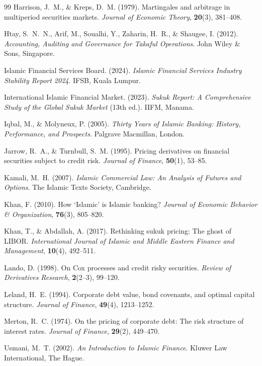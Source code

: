 \documentclass[10pt,twocolumn]{article}
\theoremstyle{plain}
\theoremstyle{definition}
\begin{document}
\begin{thebibliography}{99}
Harrison, J.~M., \& Kreps, D.~M. (1979).
Martingales and arbitrage in multiperiod securities markets.
\textit{Journal of Economic Theory}, \textbf{20}(3), 381--408.

Htay, S.~N.~N., Arif, M., Soualhi, Y., Zaharin, H.~R., \&
Shaugee, I. (2012).
\textit{Accounting, Auditing and Governance for Takaful
Operations}.
John Wiley \& Sons, Singapore.

Islamic Financial Services Board. (2024).
\textit{Islamic Financial Services Industry Stability Report 2024}.
IFSB, Kuala Lumpur.

International Islamic Financial Market. (2023).
\textit{Sukuk Report: A Comprehensive Study of the Global Sukuk
Market} (13th ed.). IIFM, Manama.

Iqbal, M., \& Molyneux, P. (2005).
\textit{Thirty Years of Islamic Banking: History, Performance,
and Prospects}.
Palgrave Macmillan, London.

Jarrow, R.~A., \& Turnbull, S.~M. (1995).
Pricing derivatives on financial securities subject to credit
risk.
\textit{Journal of Finance}, \textbf{50}(1), 53--85.

Kamali, M.~H. (2007).
\textit{Islamic Commercial Law: An Analysis of Futures and Options}.
The Islamic Texts Society, Cambridge.

Khan, F. (2010).
How `Islamic' is Islamic banking?
\textit{Journal of Economic Behavior \& Organization},
\textbf{76}(3), 805--820.

Khan, T., \& Abdallah, A. (2017).
Rethinking sukuk pricing: The ghost of LIBOR.
\textit{International Journal of Islamic and Middle Eastern
Finance and Management}, \textbf{10}(4), 492--511.

Lando, D. (1998).
On Cox processes and credit risky securities.
\textit{Review of Derivatives Research}, \textbf{2}(2--3), 99--120.

Leland, H.~E. (1994).
Corporate debt value, bond covenants, and optimal capital structure.
\textit{Journal of Finance}, \textbf{49}(4), 1213--1252.

Merton, R.~C. (1974).
On the pricing of corporate debt: The risk structure of interest
rates.
\textit{Journal of Finance}, \textbf{29}(2), 449--470.

Usmani, M.~T. (2002).
\textit{An Introduction to Islamic Finance}.
Kluwer Law International, The Hague.

\end{thebibliography}
\end{document}
